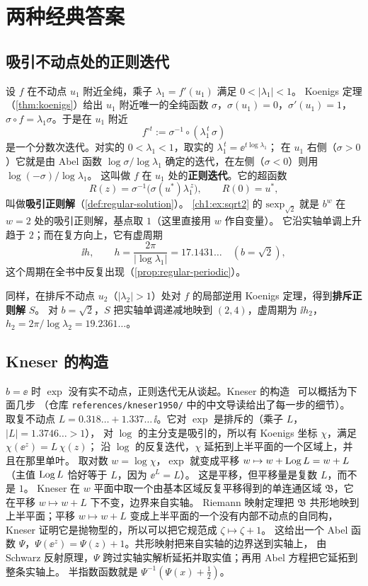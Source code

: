 \section{两种经典答案}\label{ch1:sec:classical}

\subsection{吸引不动点处的正则迭代}\label{ch1:sec:regular}

设 $f$ 在不动点 $u_1$ 附近全纯，乘子 $\lambda_1=f'(u_1)$ 满足 $0<|\lambda_1|<1$。
Koenigs 定理（\cref{thm:koenigs}）给出 $u_1$ 附近唯一的全纯函数 $\sigma$，$\sigma(u_1)=0$，$\sigma'(u_1)=1$，
$\sigma\circ f=\lambda_1\sigma$。于是在 $u_1$ 附近
\[
  f^{\circ t}:=\sigma^{-1}\circ(\lambda_1^{\,t}\,\sigma)
\]
是一个分数次迭代。对实的 $0<\lambda_1<1$，取实的 $\lambda_1^{\,t}=\ee^{t\log\lambda_1}$；
在 $u_1$ 右侧（$\sigma>0$）它就是由 Abel 函数 $\log\sigma/\log\lambda_1$ 确定的迭代，在左侧（$\sigma<0$）则用 $\log(-\sigma)/\log\lambda_1$。
这叫做 $f$ 在 $u_1$ 处的\textbf{正则迭代}。它的超函数
\[
  R(z)=\sigma^{-1}\bigl(\sigma(u^*)\lambda_1^{\,z}\bigr),\qquad R(0)=u^*,
\]
叫做\textbf{吸引正则解}（\cref{def:regular-solution}）。
\cref{ch1:ex:sqrt2} 的 $\mathrm{sexp}_{\sqrt2}$ 就是 $b^w$ 在 $w=2$ 处的吸引正则解，基点取 $1$（这里直接用 $w$ 作自变量）。
它沿实轴单调上升趋于 $2$；而在复方向上，它有虚周期
\[
  \ii h,\qquad h=\frac{2\pi}{|\log\lambda_1|}=17.1431\ldots\quad(b=\sqrt2),
\]
这个周期在全书中反复出现（\cref{prop:regular-periodic}）。

同样，在排斥不动点 $u_2$（$|\lambda_2|>1$）处对 $f$ 的局部逆用 Koenigs 定理，得到\textbf{排斥正则解} $S$。
对 $b=\sqrt2$，$S$ 把实轴单调递减地映到 $(2,4)$，虚周期为 $\ii h_2$，$h_2=2\pi/\log\lambda_2=19.2361\ldots$。

\subsection{Kneser 的构造}\label{ch1:sec:kneser}

$b=\ee$ 时 $\exp$ 没有实不动点，正则迭代无从谈起。Kneser 的构造~\cite{Kneser1950} 可以概括为下面几步
（仓库 \texttt{references/kneser1950/} 中的中文导读给出了每一步的细节）。
取复不动点 $L=0.318\ldots+1.337\ldots\,\ii$。它对 $\exp$ 是排斥的（乘子 $L$，$|L|=1.3746\ldots>1$），
对 $\log$ 的主分支是吸引的，所以有 Koenigs 坐标 $\chi$，满足 $\chi(\ee^{z})=L\,\chi(z)$；
沿 $\log$ 的反复迭代，$\chi$ 延拓到上半平面的一个区域上，并且在那里单叶。
取对数 $w=\log\chi$，$\exp$ 就变成平移 $w\mapsto w+\operatorname{Log} L=w+L$（主值 $\operatorname{Log} L$ 恰好等于 $L$，因为 $\ee^L=L$）。
这是平移，但平移量是复数 $L$，而不是 $1$。
Kneser 在 $w$ 平面中取一个由基本区域反复平移得到的单连通区域 $\mathfrak B$，它在平移 $w\mapsto w+L$ 下不变，边界来自实轴。
Riemann 映射定理把 $\mathfrak B$ 共形地映到上半平面；平移 $w\mapsto w+L$ 变成上半平面的一个没有内部不动点的自同构，
Kneser 证明它是抛物型的，所以可以把它规范成 $\zeta\mapsto\zeta+1$。
这给出一个 Abel 函数 $\Psi$，$\Psi(\ee^z)=\Psi(z)+1$。共形映射把来自实轴的边界送到实轴上，
由 Schwarz 反射原理，$\Psi$ 跨过实轴实解析延拓并取实值；再用 Abel 方程把它延拓到整条实轴上。
半指数函数就是 $\Psi^{-1}(\Psi(x)+\frac12)$。

